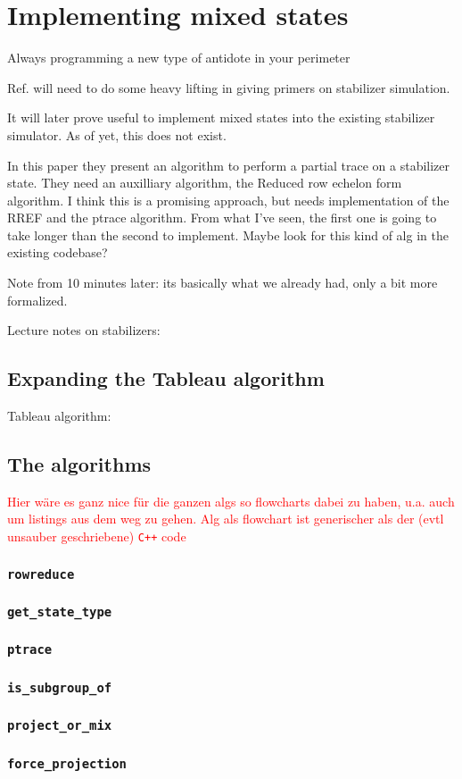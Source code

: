 \chapter{Implementing mixed states}
\label{ch:mixed}
\epigraph{Always programming a new type of antidote in your perimeter}{
\citeauthor{quasimotoDiscipline99Pt2000}
}

Ref. \cite{aaronsonImprovedSimulationStabilizer2004} will need to do some heavy
lifting in giving primers on stabilizer simulation.

It will later prove useful to implement mixed states into the existing
stabilizer simulator. As of yet, this does not exist.

In this paper \cite{audenaertEntanglementMixedStabilizer2005} they present an
algorithm to perform a partial trace on a stabilizer state. They need an
auxilliary algorithm, the Reduced row echelon form algorithm. I think this is a
promising approach, but needs implementation of the RREF and the ptrace
algorithm. From what I've seen, the first one is going to take longer than the
second to implement. Maybe look for this kind of alg in the existing codebase?

Note from 10 minutes later: its basically what we already had, only a bit more
formalized. 

Lecture notes on stabilizers: \cite{arabLectureNotesQuantum2024}

\section{Expanding the Tableau algorithm}
Tableau algorithm: \cite{aaronsonImprovedSimulationStabilizer2004}

\section{The algorithms}
\textcolor{red}{Hier w\"are es ganz nice f\"ur die ganzen algs so flowcharts
dabei zu haben, u.a. auch um listings aus dem weg zu gehen. Alg als flowchart
ist generischer als der (evtl unsauber geschriebene) \texttt{C++} code}

\subsection{\texttt{rowreduce}}

\subsection{\texttt{get\_state\_type}}

\subsection{\texttt{ptrace}}

\subsection{\texttt{is\_subgroup\_of}}

\subsection{\texttt{project\_or\_mix}}

\subsection{\texttt{force\_projection}}
